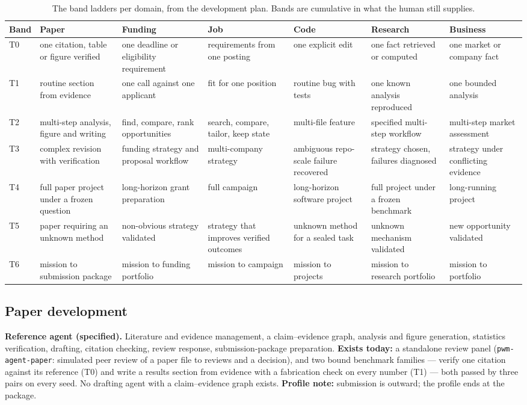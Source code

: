 \begin{table}[!htbp]
\centering\scriptsize
\begin{tabularx}{\textwidth}{@{}lYYYYYY@{}}
\toprule
Band & Paper & Funding & Job & Code & Research & Business \\
\midrule
T0 & one citation, table or figure verified & one deadline or eligibility requirement & requirements from one posting & one explicit edit & one fact retrieved or computed & one market or company fact \\
T1 & routine section from evidence & one call against one applicant & fit for one position & routine bug with tests & one known analysis reproduced & one bounded analysis \\
T2 & multi-step analysis, figure and writing & find, compare, rank opportunities & search, compare, tailor, keep state & multi-file feature & specified multi-step workflow & multi-step market assessment \\
T3 & complex revision with verification & funding strategy and proposal workflow & multi-company strategy & ambiguous repo-scale failure recovered & strategy chosen, failures diagnosed & strategy under conflicting evidence \\
T4 & full paper project under a frozen question & long-horizon grant preparation & full campaign & long-horizon software project & full project under a frozen benchmark & long-running project \\
T5 & paper requiring an unknown method & non-obvious strategy validated & strategy that improves verified outcomes & unknown method for a sealed task & unknown mechanism validated & new opportunity validated \\
T6 & mission to submission package & mission to funding portfolio & mission to campaign & mission to projects & mission to research portfolio & mission to portfolio \\
\bottomrule
\end{tabularx}
\caption{The band ladders per domain, from the development plan. Bands are cumulative in what the human still supplies.}
\label{tab:bands}
\end{table}

\subsection{Paper development}

\textbf{Reference agent (specified).} Literature and evidence management, a claim--evidence graph, analysis and figure generation, statistics verification, drafting, citation checking, review response, submission-package preparation. \textbf{Exists today:} a standalone review panel (\texttt{pwm-agent-paper}: simulated peer review of a paper file to reviews and a decision), and two bound benchmark families --- verify one citation against its reference (T0) and write a results section from evidence with a fabrication check on every number (T1) --- both passed by three pairs on every seed. No drafting agent with a claim--evidence graph exists. \textbf{Profile note:} submission is outward; the profile ends at the package.

